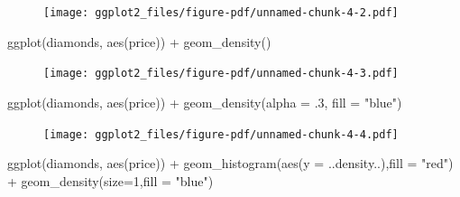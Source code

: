 \documentclass[
  letterpaper,
  DIV=11,
  numbers=noendperiod]{scrreprt}
\newenvironment{Shaded}{\begin{snugshade}}{\end{snugshade}}
\newcommand{\AttributeTok}[1]{\textcolor[rgb]{0.40,0.45,0.13}{#1}}
\newcommand{\DecValTok}[1]{\textcolor[rgb]{0.68,0.00,0.00}{#1}}
\newcommand{\FunctionTok}[1]{\textcolor[rgb]{0.28,0.35,0.67}{#1}}
\newcommand{\NormalTok}[1]{\textcolor[rgb]{0.00,0.23,0.31}{#1}}
\newcommand{\SpecialCharTok}[1]{\textcolor[rgb]{0.37,0.37,0.37}{#1}}
\newcommand{\StringTok}[1]{\textcolor[rgb]{0.13,0.47,0.30}{#1}}
\begin{document}
\begin{figure}[H]

{\centering \texttt{[image: ggplot2\_files/figure-pdf/unnamed-chunk-4-2.pdf]}

}

\end{figure}

\begin{Shaded}
\begin{Highlighting}[]
\FunctionTok{ggplot}\NormalTok{(diamonds, }\FunctionTok{aes}\NormalTok{(price)) }\SpecialCharTok{+}
  \FunctionTok{geom\_density}\NormalTok{()}
\end{Highlighting}
\end{Shaded}

\begin{figure}[H]

{\centering \texttt{[image: ggplot2\_files/figure-pdf/unnamed-chunk-4-3.pdf]}

}

\end{figure}

\begin{Shaded}
\begin{Highlighting}[]
\FunctionTok{ggplot}\NormalTok{(diamonds, }\FunctionTok{aes}\NormalTok{(price)) }\SpecialCharTok{+}
  \FunctionTok{geom\_density}\NormalTok{(}\AttributeTok{alpha =}\NormalTok{ .}\DecValTok{3}\NormalTok{, }\AttributeTok{fill =} \StringTok{"blue"}\NormalTok{)}
\end{Highlighting}
\end{Shaded}

\begin{figure}[H]

{\centering \texttt{[image: ggplot2\_files/figure-pdf/unnamed-chunk-4-4.pdf]}

}

\end{figure}

\begin{Shaded}
\begin{Highlighting}[]
\FunctionTok{ggplot}\NormalTok{(diamonds, }\FunctionTok{aes}\NormalTok{(price)) }\SpecialCharTok{+}
  \FunctionTok{geom\_histogram}\NormalTok{(}\FunctionTok{aes}\NormalTok{(}\AttributeTok{y =}\NormalTok{ ..density..),}\AttributeTok{fill =} \StringTok{"red"}\NormalTok{) }\SpecialCharTok{+}
  \FunctionTok{geom\_density}\NormalTok{(}\AttributeTok{size=}\DecValTok{1}\NormalTok{,}\AttributeTok{fill =} \StringTok{"blue"}\NormalTok{)}
\end{Highlighting}
\end{Shaded}
\end{document}
